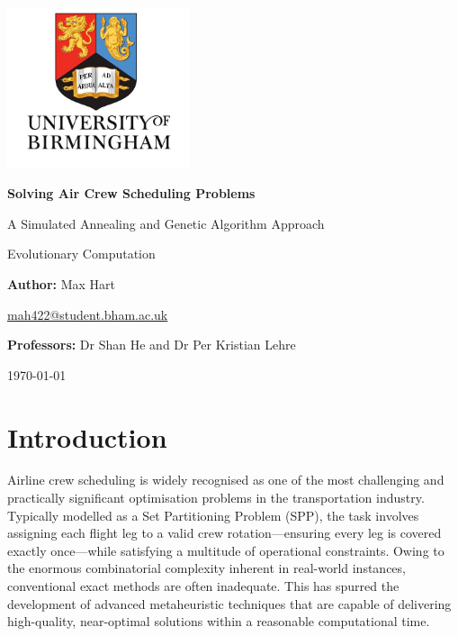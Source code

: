 \documentclass[12pt]{article}
\begin{document}
\begin{titlepage}
    \centering
    \vspace*{1cm}
    
    \includegraphics[width=0.4\textwidth]{UoB.jpg}\par\vspace{1cm}
    
    {\LARGE\bfseries Solving Air Crew Scheduling Problems\par}
    \vspace{0.5cm}
    {\Large A Simulated Annealing and Genetic Algorithm Approach\par}
    \vspace{0.75cm}
    
    {\large Evolutionary Computation\par}
    \vspace{1.5cm}
    
    {\large\textbf{Author:} Max Hart\par}
    \vspace{0.3cm}
    {\normalsize \href{mailto:mah422@student.bham.ac.uk}{mah422@student.bham.ac.uk}\par}
    \vspace{1.5cm}
    
    {\large\textbf{Professors:} Dr Shan He and Dr Per Kristian Lehre\par}
    \vspace{1cm}
    
    {\large \today\par}
    
\end{titlepage}

\tableofcontents
\newpage

\section{Introduction}
Airline crew scheduling is widely recognised as one of the most challenging and practically significant optimisation problems in the transportation industry. Typically modelled as a Set Partitioning Problem (SPP), the task involves assigning each flight leg to a valid crew rotation—ensuring every leg is covered exactly once—while satisfying a multitude of operational constraints. Owing to the enormous combinatorial complexity inherent in real-world instances, conventional exact methods are often inadequate. This has spurred the development of advanced metaheuristic techniques that are capable of delivering high-quality, near-optimal solutions within a reasonable computational time.
\end{document}
